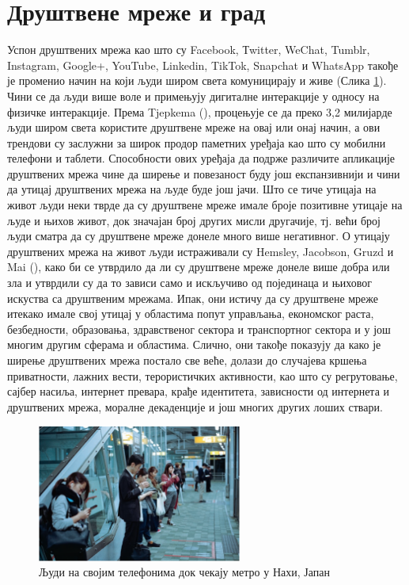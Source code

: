 \documentclass{article}
\begin{document}
\section{Друштвене мреже и град}
Успон друштвених мрежа као што су Facebook, Тwitter, WeChat, Tumblr, Instagram, Google+, YouTube, Linkedin, TikTok, Snapchat и WhatsApp такође је променио начин на који људи широм света комуницирају и живе (Слика \ref{fig:mreze}). Чини се да људи више воле и примењују дигиталне интеракције у односу на физичке интеракције. Према Tjepkema (\cite{t_2019}), процењује се да преко 3,2 милијарде људи широм света користите друштвене мреже на овај или онај начин, а ови трендови су заслужни за широк продор паметних уређаја као што су мобилни телефони и таблети. Способности ових уређаја да подрже различите апликације друштвених мрежа чине да ширење и повезаност буду још експанзивнији и чини да утицај друштвених мрежа на људе буде још јачи. Што се тиче утицаја на живот људи неки тврде да су друштвене мреже имале броје позитивне утицаје на људе и њихов живот, док значајан број других мисли другачије, тј. већи број људи сматра да су друштвене мреже донеле много више негативног. О утицају друштвених мрежа на живот људи истраживали су  Hemsley, Jacobson, Gruzd и Mai (\cite{m_2018}), како би се утврдило да ли су друштвене мреже донеле више добра или зла и утврдили су да то зависи само и искључиво од појединаца и њиховог искуства са друштвеним мрежама. Ипак, они истичу да су друштвене мреже итекако имале свој утицај у областима попут управљања, економског раста, безбедности, образовања, здравственог сектора и транспортног сектора и у још многим другим сферама и областима. Слично, они такође показују да како је ширење друштвених мрежа постало све веће, долази до случајева кршења приватности, лажних вести, терористичких активности, као што су регрутовање, сајбер насиља, интернет превара, крађе идентитета, зависности од интернета и друштвених мрежа, моралне декаденције и још многих других лоших ствари. \\
\begin{figure}[h!]
\centering
\includegraphics[width=0.6\textwidth]{slike/drustvene_mreze.png}
\caption{\label{fig:mreze}Људи на својим телефонима док чекају метро у Нахи, Јапан}
\end{figure}
\end{document}
